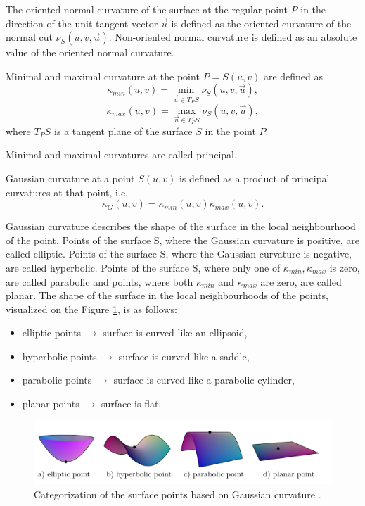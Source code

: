\begin{definition}
    The oriented normal curvature of the surface at the regular point $P$ in the direction of the unit tangent vector
    $\vec{u}$ is defined as the oriented curvature of the normal cut $\nu_S(u, v, \vec{u})$.
    Non-oriented normal curvature is defined as an absolute value of the oriented normal curvature.
\end{definition}

\begin{definition}
    Minimal and maximal curvature at the point $P = S(u,v)$ are defined as
    $$\kappa_{min}(u,v) = \min_{\vec{u} \in T_PS} \nu_S(u, v, \vec{u}),$$
    $$\kappa_{max}(u,v) = \max_{\vec{u} \in T_PS} \nu_S(u, v, \vec{u}),$$
    where $T_PS$ is a tangent plane of the surface $S$ in the point $P$.

    Minimal and maximal curvatures are called principal.
\end{definition}

\begin{definition}
    Gaussian curvature at a point $S(u, v)$ is defined as a product of principal curvatures
    at that point, i.e.
    $$\kappa_G(u, v) = \kappa_{min}(u,v) \kappa_{max}(u,v).$$
\end{definition}

Gaussian curvature describes the shape of the surface in the local neighbourhood of the point.
Points of the surface S, where the Gaussian curvature is positive, are called elliptic.
Points of the surface S, where the Gaussian curvature is negative, are called hyperbolic.
Points of the surface S, where only one of $\kappa_{min}, \kappa_{max}$ is zero, are called
parabolic and points, where both $\kappa_{min}$ and $\kappa_{max}$ are zero, are called planar.
The shape of the surface in the local neighbourhoods of the points, visualized on the
Figure \ref{img:33}, is as follows:
\begin{itemize}
    \item {elliptic points $\longrightarrow$ surface is curved like an ellipsoid,}
    \item {hyperbolic points $\longrightarrow$ surface is curved like a saddle,}
    \item {parabolic points $\longrightarrow$ surface is curved like a parabolic cylinder,}
    \item {planar points $\longrightarrow$ surface is flat.}
\end{itemize}

\begin{figure}
    \centerline{\includegraphics[scale=0.5]{images/img33}}
    \caption[Categorization of the surface points based on Gaussian curvature]
    {Categorization of the surface points based on Gaussian curvature \cite{morris2003client}.}
    \label{img:33}
\end{figure}

